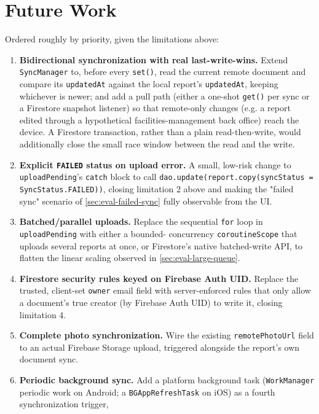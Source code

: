\section{Future Work}
\label{sec:future-work}

Ordered roughly by priority, given the limitations above:

\begin{enumerate}[label=\textbf{F\arabic*.}]
  \item \textbf{Bidirectional synchronization with real last-write-wins.}
  Extend \texttt{SyncManager} to, before every \texttt{set()}, read the
  current remote document and compare its \texttt{updatedAt} against the
  local report's \texttt{updatedAt}, keeping whichever is newer; and add a
  pull path (either a one-shot \texttt{get()} per sync or a Firestore
  snapshot listener) so that remote-only changes (e.g. a report edited
  through a hypothetical facilities-management back office) reach the
  device. A Firestore transaction, rather than a plain read-then-write,
  would additionally close the small race window between the read and the
  write.
  \item \textbf{Explicit \texttt{FAILED} status on upload error.} A
  small, low-risk change to \texttt{uploadPending}'s \texttt{catch} block
  to call \texttt{dao.update(report.copy(syncStatus = SyncStatus.FAILED))},
  closing limitation 2 above and making the "failed sync" scenario of
  \cref{sec:eval-failed-sync} fully observable from the UI.
  \item \textbf{Batched/parallel uploads.} Replace the sequential
  \texttt{for} loop in \texttt{uploadPending} with either a bounded-
  concurrency \texttt{coroutineScope} that uploads several reports at
  once, or Firestore's native batched-write API, to flatten the linear
  scaling observed in \cref{sec:eval-large-queue}.
  \item \textbf{Firestore security rules keyed on Firebase Auth UID.}
  Replace the trusted, client-set \texttt{owner} email field with
  server-enforced rules that only allow a document's true creator (by
  Firebase Auth UID) to write it, closing limitation 4.
  \item \textbf{Complete photo synchronization.} Wire the existing
  \texttt{remotePhotoUrl} field to an actual Firebase Storage upload,
  triggered alongside the report's own document sync.
  \item \textbf{Periodic background sync.} Add a platform background task
  (\texttt{WorkManager} periodic work on Android; a
  \texttt{BGAppRefreshTask} on iOS) as a fourth synchronization trigger,

\end{enumerate}
